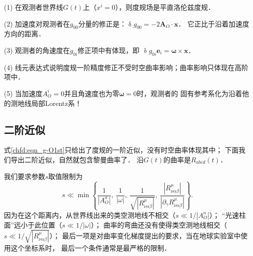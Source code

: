 (1) 在观测者世界线$G(t)$上（$x^i=0$），则度规场是平直洛伦兹度规．

(2) 加速度对观测者在$g_{00}$分量的修正是：$\updelta g_{00}=-2 \boldsymbol{A}_O \cdot \boldsymbol{x}$．
  它正比于沿着加速度方向的距离．

(3) 观测者的角速度在$g_{0i}$修正项中有体现，即
$\updelta g_{0i} \boldsymbol{e}_i= \boldsymbol{\omega}\times \boldsymbol{x}$．

(4) 线元表达式说明度规一阶精度修正不受时空曲率影响；曲率影响只体现在高阶项中．

(5) 当加速度$A_O^i=0$并且角速度也为零$\boldsymbol{\omega}=0$时，观测者的
固有参考系化为沿着他的测地线局部Lorentz系！





\subsection{二阶近似}
式\eqref{chfd:eqn_g-O1st}只给出了度规的一阶近似，没有时空曲率体现其中；
下面我们导出二阶近似\cite{niwt-1978}，自然就包含黎曼曲率了．
沿$G(t)$的曲率是$R_{abcd}(t)$．


我们要求参数$s$取值限制为
\begin{equation}\label{chfd:eqn_proper-s}
    s \ll \min \left\{\frac{1}{|A_O^a|},\ \frac{1}{|\omega|},\
      \frac{1}{\sqrt{|R^\mu_{\nu\alpha\beta}|}},\
      \frac{|R^\mu_{\nu\alpha\beta}|}{|\partial_\gamma R^\mu_{\nu\alpha\beta}|}\right\} .
\end{equation}
因为在这个距离内，从世界线出来的类空测地线不相交（$s \ll {1}/{|A_O^a|}$）；
“光速柱面”远小于此位置（$s \ll {1}/{|\omega|}$）；
曲率的弯曲还没有使得类空测地线相交（$s\ll {1}/{\sqrt{|R^\mu_{\nu\alpha\beta}|}}$）；
最后一项是对曲率变化梯度提出的要求，当在地球实验室中使用这个坐标系时，
最后一个条件通常是最严格的限制．


